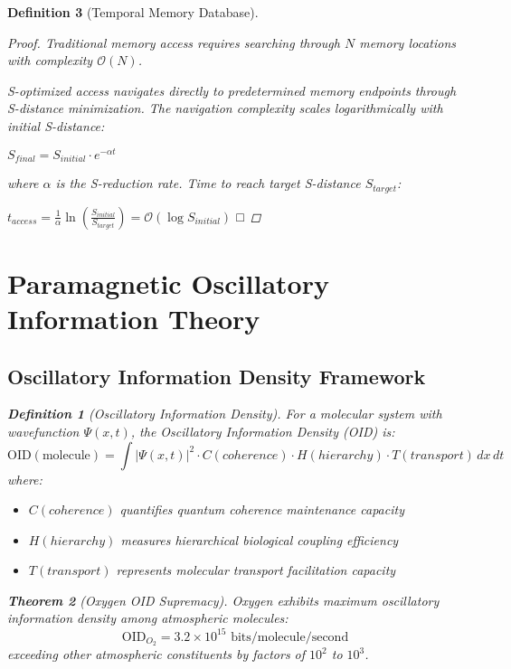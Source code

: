 \documentclass[12pt]{article}
\newtheorem{theorem}{Theorem}[section]
\newtheorem{definition}[theorem]{Definition}
\begin{document}
\begin{definition}[Temporal Memory Database]
\begin{proof}
Traditional memory access requires searching through $N$ memory locations with complexity $\mathcal{O}(N)$.

S-optimized access navigates directly to predetermined memory endpoints through S-distance minimization. The navigation complexity scales logarithmically with initial S-distance:

$S_{final} = S_{initial} \cdot e^{-\alpha t}$

where $\alpha$ is the S-reduction rate. Time to reach target S-distance $S_{target}$:

$t_{access} = \frac{1}{\alpha} \ln\left(\frac{S_{initial}}{S_{target}}\right) = \mathcal{O}(\log S_{initial})$ □
\end{proof}

\section{Paramagnetic Oscillatory Information Theory}

\subsection{Oscillatory Information Density Framework}

\begin{definition}[Oscillatory Information Density]
For a molecular system with wavefunction $\Psi(x,t)$, the Oscillatory Information Density (OID) is:
\begin{equation}
\text{OID}(\text{molecule}) = \int |\Psi(x,t)|^2 \cdot C(coherence) \cdot H(hierarchy) \cdot T(transport) \, dx \, dt
\end{equation}
where:
\begin{itemize}
\item $C(coherence)$ quantifies quantum coherence maintenance capacity
\item $H(hierarchy)$ measures hierarchical biological coupling efficiency  
\item $T(transport)$ represents molecular transport facilitation capacity
\end{itemize}
\end{definition}

\begin{theorem}[Oxygen OID Supremacy]
Oxygen exhibits maximum oscillatory information density among atmospheric molecules:
\begin{equation}
\text{OID}_{O_2} = 3.2 \times 10^{15} \text{ bits/molecule/second}
\end{equation}
exceeding other atmospheric constituents by factors of $10^2$ to $10^3$.
\end{theorem}


\end{definition}
\end{document}
